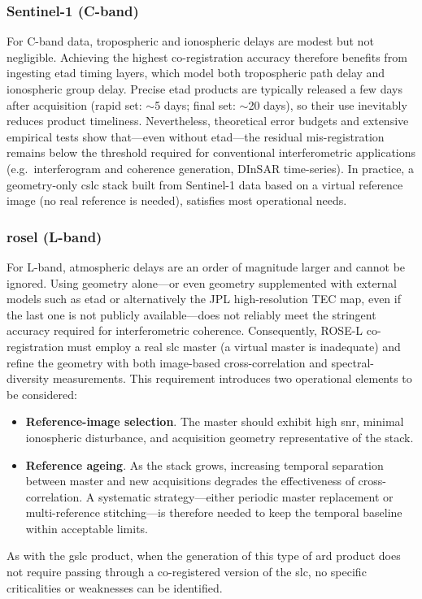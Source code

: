\subsubsection{Sentinel-1 (C-band)}  
For C-band data, tropospheric and ionospheric delays are modest but not negligible.  
Achieving the highest co-registration accuracy therefore benefits from ingesting \acs{etad} timing layers, which model both tropospheric path delay and ionospheric group delay.  
Precise \acs{etad} products are typically released a few days after acquisition (rapid set: \(\sim\)5 days; final set: \(\sim\)20 days), so their use inevitably reduces product timeliness.  
Nevertheless, theoretical error budgets and extensive empirical tests show that—even without \acs{etad}—the residual mis-registration remains below the threshold required for conventional interferometric applications (e.g.\ interferogram and coherence generation, DInSAR time-series).  
In practice, a geometry-only \acs{cslc} stack built from Sentinel-1 data based on a virtual reference image (no real reference is needed), satisfies most operational needs.

\subsubsection{\acs{rosel} (L-band)}
\label{sec:cslc_criticalities_rosel}

For L-band, atmospheric delays are an order of magnitude larger and cannot be ignored.  
Using geometry alone—or even geometry supplemented with external models such as \acs{etad} or alternatively the JPL high-resolution TEC map, even if the last one is not publicly available—does not reliably meet the stringent accuracy required for interferometric coherence.  
Consequently, ROSE-L co-registration must employ a real \acs{slc} master (a virtual master is inadequate) and refine the geometry with both image-based cross-correlation and spectral-diversity measurements.  
This requirement introduces two operational elements to be considered:
\begin{itemize}
\item \textbf{Reference-image selection}. The master should exhibit high \acs{snr}, minimal ionospheric disturbance, and acquisition geometry representative of the stack.  
\item \textbf{Reference ageing}. As the stack grows, increasing temporal separation between master and new acquisitions degrades the effectiveness of cross-correlation.  A systematic strategy—either periodic master replacement or multi-reference stitching—is therefore needed to keep the temporal baseline within acceptable limits.
\end{itemize}

As with the \acs{gslc} product, when the generation of this type of \acs{ard} product does not require passing through a co-registered version of the \acs{slc}, no specific criticalities or weaknesses can be identified.